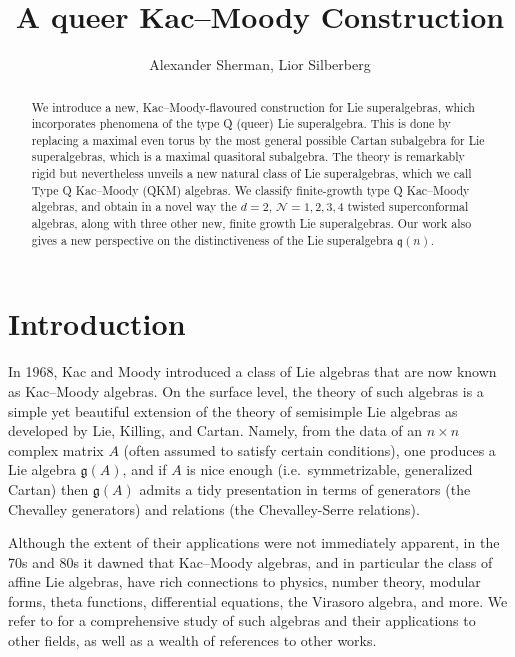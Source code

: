 \documentclass[12pt, a4paper, reqno]{amsart}
\def\NN{\mathcal{N}}
\def\q{\mathfrak{q}}
\def\g{\mathfrak{g}}
\theoremstyle{definition}
\theoremstyle{definition}
\theoremstyle{definition}
\numberwithin{theorem}{section}
\numberwithin{lemma}{section}
\numberwithin{remark}{section}
\numberwithin{definition}{section}
\numberwithin{corollary}{section}
\numberwithin{proposition}{section}
\numberwithin{example}{section}
\begin{document}
	
	
	\title{A queer Kac--Moody Construction}
	
	\author[A.~Sherman, L.~Silberberg]{Alexander Sherman, Lior Silberberg}
	
	\begin{abstract} We introduce a new, Kac--Moody-flavoured construction for Lie superalgebras, which incorporates phenomena of the type Q (queer) Lie superalgebra.  This is done by replacing a maximal even torus by the most general possible Cartan subalgebra for Lie superalgebras, which is a maximal quasitoral subalgebra.  The theory is remarkably rigid but nevertheless unveils a new natural class of Lie superalgebras, which we call Type Q Kac--Moody (QKM) algebras.  We classify finite-growth type Q Kac--Moody algebras, and obtain in a novel way the $d=2$, $\NN=1,2,3,4$ twisted superconformal algebras, along with three other new, finite growth Lie superalgebras.  Our work also gives a new perspective on the distinctiveness of the Lie superalgebra $\q(n)$.  
	\end{abstract}
	
	\maketitle
	\pagestyle{plain}
	
	\section{Introduction}
	
	In 1968, Kac \cite{K3} and Moody \cite{Moody} introduced a class of Lie algebras that are now known as Kac--Moody algebras.  On the surface level, the theory of such algebras is a simple yet beautiful extension of the theory of semisimple Lie algebras as developed by Lie, Killing, and Cartan.   Namely, from the data of an $n\times n$ complex matrix $A$ (often assumed to satisfy certain conditions), one produces a Lie algebra $\g(A)$, and if $A$ is nice enough (i.e.~symmetrizable, generalized Cartan) then $\g(A)$ admits a tidy presentation in terms of generators (the Chevalley generators) and relations (the Chevalley-Serre relations).   
	
	Although the extent of their applications were not immediately apparent, in the 70s and 80s it dawned that Kac--Moody algebras, and in particular the class of affine Lie algebras, have rich connections to physics, number theory, modular forms, theta functions, differential equations, the Virasoro algebra, and more.  We refer to \cite{K} for a comprehensive study of such algebras and their applications to other fields, as well as a wealth of references to other works.
	
\end{document}
